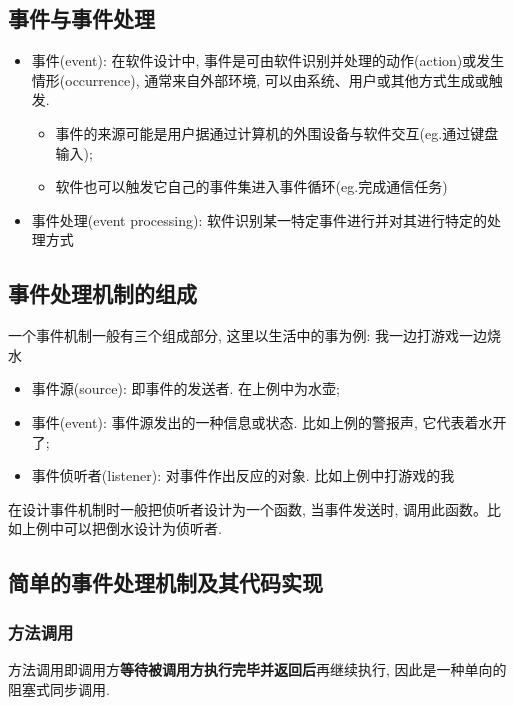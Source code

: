 \documentclass[12pt, a4paper, oneside]{ctexart}
\begin{document}
\subsection{事件与事件处理}

    \begin{itemize}
        \item 事件(event): 在软件设计中, 事件是可由软件识别并处理的动作(action)或发生情形(occurrence), 通常来自外部环境, 可以由系统、用户或其他方式生成或触发. 
        \begin{itemize}
            \item 事件的来源可能是用户据通过计算机的外围设备与软件交互(eg.通过键盘输入); 
            \item 软件也可以触发它自己的事件集进入事件循环(eg.完成通信任务)
        \end{itemize}
        \item 事件处理(event processing): 软件识别某一特定事件进行并对其进行特定的处理方式
    \end{itemize}

\subsection{事件处理机制的组成}

    一个事件机制一般有三个组成部分, 这里以生活中的事为例: 我一边打游戏一边烧水
    \begin{itemize}
        \item 事件源(source): 即事件的发送者. 在上例中为水壶; 
        \item 事件(event): 事件源发出的一种信息或状态. 比如上例的警报声, 它代表着水开了; 
        \item 事件侦听者(listener): 对事件作出反应的对象. 比如上例中打游戏的我
    \end{itemize}
    在设计事件机制时一般把侦听者设计为一个函数, 当事件发送时, 调用此函数。比如上例中可以把倒水设计为侦听者. 

\subsection{简单的事件处理机制及其代码实现}

    \subsubsection{方法调用}

        方法调用即调用方\textbf{等待被调用方执行完毕并返回后}再继续执行, 因此是一种单向的阻塞式同步调用. 
\end{document}
